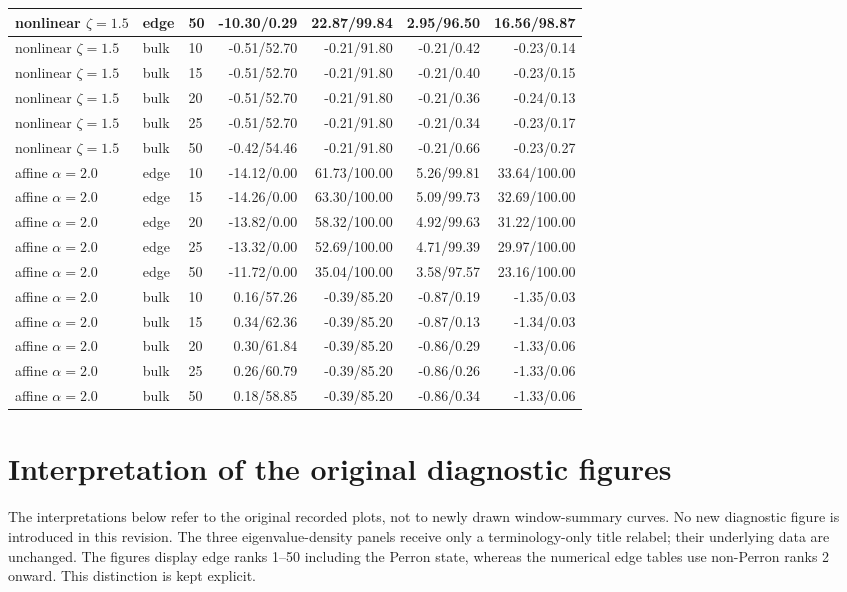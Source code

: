 \documentclass[10pt,letterpaper]{article}
\begin{document}
\begin{longtable}{|l|l|l|r|r|r|r|}
nonlinear $\zeta=1.5$ & edge & 50 & -10.30/0.29 & 22.87/99.84 & 2.95/96.50 & 16.56/98.87 \\\hline
\hline
nonlinear $\zeta=1.5$ & bulk & 10 & -0.51/52.70 & -0.21/91.80 & -0.21/0.42 & -0.23/0.14 \\\hline
nonlinear $\zeta=1.5$ & bulk & 15 & -0.51/52.70 & -0.21/91.80 & -0.21/0.40 & -0.23/0.15 \\\hline
nonlinear $\zeta=1.5$ & bulk & 20 & -0.51/52.70 & -0.21/91.80 & -0.21/0.36 & -0.24/0.13 \\\hline
nonlinear $\zeta=1.5$ & bulk & 25 & -0.51/52.70 & -0.21/91.80 & -0.21/0.34 & -0.23/0.17 \\\hline
nonlinear $\zeta=1.5$ & bulk & 50 & -0.42/54.46 & -0.21/91.80 & -0.21/0.66 & -0.23/0.27 \\\hline
\hline
affine $\alpha=2.0$ & edge & 10 & -14.12/0.00 & 61.73/100.00 & 5.26/99.81 & 33.64/100.00 \\\hline
affine $\alpha=2.0$ & edge & 15 & -14.26/0.00 & 63.30/100.00 & 5.09/99.73 & 32.69/100.00 \\\hline
affine $\alpha=2.0$ & edge & 20 & -13.82/0.00 & 58.32/100.00 & 4.92/99.63 & 31.22/100.00 \\\hline
affine $\alpha=2.0$ & edge & 25 & -13.32/0.00 & 52.69/100.00 & 4.71/99.39 & 29.97/100.00 \\\hline
affine $\alpha=2.0$ & edge & 50 & -11.72/0.00 & 35.04/100.00 & 3.58/97.57 & 23.16/100.00 \\\hline
\hline
affine $\alpha=2.0$ & bulk & 10 & 0.16/57.26 & -0.39/85.20 & -0.87/0.19 & -1.35/0.03 \\\hline
affine $\alpha=2.0$ & bulk & 15 & 0.34/62.36 & -0.39/85.20 & -0.87/0.13 & -1.34/0.03 \\\hline
affine $\alpha=2.0$ & bulk & 20 & 0.30/61.84 & -0.39/85.20 & -0.86/0.29 & -1.33/0.06 \\\hline
affine $\alpha=2.0$ & bulk & 25 & 0.26/60.79 & -0.39/85.20 & -0.86/0.26 & -1.33/0.06 \\\hline
affine $\alpha=2.0$ & bulk & 50 & 0.18/58.85 & -0.39/85.20 & -0.86/0.34 & -1.33/0.06 \\\hline
\hline
\hline\end{longtable}\endgroup
\section{Interpretation of the original diagnostic figures}
\label{sec:original-figures}
The interpretations below refer to the original recorded plots, not to newly drawn window-summary curves. No new diagnostic figure is introduced in this revision. The three eigenvalue-density panels receive only a terminology-only title relabel; their underlying data are unchanged. The figures display edge ranks 1--50 including the Perron state, whereas the numerical edge tables use non-Perron ranks 2 onward. This distinction is kept explicit.
\end{document}
